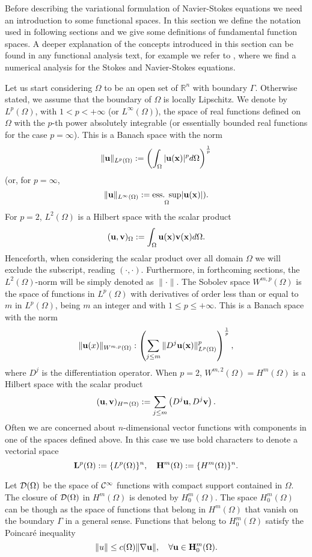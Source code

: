 Before describing the variational formulation of Navier-Stokes equations we need an introduction to some functional spaces. In this section we define the notation used in following sections and we give some definitions of fundamental function spaces. A deeper explanation of the concepts introduced in this section can be found in any functional analysis text, for example we refer to \cite{temam}, where we find a numerical analysis for the Stokes and Navier-Stokes equations.

Let us start considering $\Omega$ to be an open set of $\mathbb{R}^n$ with boundary $\Gamma$. Otherwise stated, we assume that the boundary of $\Omega$ is locally Lipschitz. We denote by $L^p(\Omega)$, with $1<p<+\infty$ (or $L^\infty(\Omega)$), the space of real functions defined on $\Omega$ with the $p$-th power absolutely integrable (or essentially bounded real functions for the case $p=\infty$). This is a Banach space with the norm 
$$\|{\bf u}\|_{L^p(\Omega)}:=\left(\int_\Omega|{\bf u}({\bf x})|^pd\Omega\right)^{\frac{1}{p}}$$
(or, for $p=\infty$,
$$\|{\bf u}\|_{L^\infty(\Omega)}:=\underset{\Omega}{\mbox{ess. sup}}|{\bf u}({\bf x})|).$$
For $p=2$, $L^2(\Omega)$ is a Hilbert space with the scalar product
$$({\bf u},{\bf v})_\Omega:=\int_\Omega{\bf u}({\bf x}){\bf v}({\bf x})d\Omega.$$
Henceforth, when considering the scalar product over all domain $\Omega$ we will exclude the subscript, reading $(\cdot,\cdot)$. Furthermore, in forthcoming sections, the $L^2(\Omega)$-norm will be simply denoted as $\|\cdot\|$.
The Sobolev space  $W^{m,p}(\Omega)$ is the space of functions in $L^p(\Omega)$ with derivatives of order less than or equal to $m$ in $L^p(\Omega)$, being $m$ an integer and with $1\leq p\leq+\infty$. This is a Banach space with the norm
$$\|{\bf u}(x)\|_{W^{m,p}(\Omega)}:\left(\sum_{j\leq m}\|D^j{\bf u}({\bf x})\|^p_{L^p(\Omega)}\right)^{\frac{1}{p}},$$
where $D^j$ is the differentiation operator. When $p=2$, $W^{m,2}(\Omega)=H^m(\Omega)$ is a Hilbert space with the scalar product
$$({\bf u},{\bf v})_{H^m(\Omega)}:=\sum_{j\leq m}\left(D^j{\bf u},D^j{\bf v}\right).$$
Often we are concerned about $n$-dimensional vector functions with components in one of the spaces defined above. In this case we use bold characters to denote a vectorial space
$${\bf L}^p(\Omega):=\{L^p(\Omega)\}^n,\quad{\bf H}^m(\Omega):=\{H^m(\Omega)\}^n.$$

Let $\mathcal{D}(\Omega)$ be the space of $\mathcal{C}^\infty$ functions with compact support contained in $\Omega$. The closure of $\mathcal{D}(\Omega)$ in $H^m(\Omega)$ is denoted by $H^m_0(\Omega)$. The space $H^m_0(\Omega)$ can be though as the space of functions that belong in $H^m(\Omega)$ that vanish on the boundary $\Gamma$ in a general sense. Functions that belong to $H^m_0(\Omega)$ satisfy the Poincaré inequality
\begin{equation}
\label{eq-Poincare_inequality}
\|u\|\leq c(\Omega)\|\nabla{\bf u}\|,\quad\forall{\bf u}\in{\bf H}^m_0(\Omega).
\end{equation}

